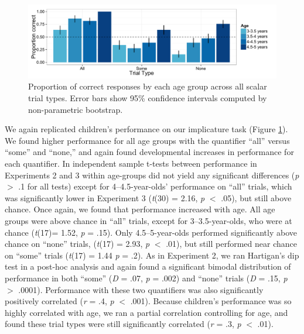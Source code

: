 \documentclass[man]{apa2}
\begin{document}
\begin{figure} 
 \begin{center} 
  \includegraphics[scale=.5]{figures/exp3_performance.pdf} 
  \caption{\label{fig:exp3_perf} Proportion of correct responses by each age group across all scalar trial types. Error bars show 95\% confidence intervals computed by non-parametric bootstrap.} 
 \end{center} 
\end{figure}

We again replicated children's performance on our implicature task (Figure \ref{fig:exp3_perf}). We found higher performance for all age groups with the quantifier ``all'' versus ``some'' and ``none,'' and again found developmental increases in performance for each quantifier. In independent sample t-tests between performance in Experiments 2 and 3 within age-groups did not yield any significant differences (\emph{p} $>$ .1 for all tests) except for 4--4.5-year-olds' performance on ``all'' trials, which was significantly lower in Experiment 3 (\emph{t}(30) = 2.16, \emph{p} $<$ .05), but still above chance. Once again, we found that performance increased with age. All age groups were above chance in ``all'' trials, except for 3--3.5-year-olds, who were at chance (\emph{t}(17)= 1.52, \emph{p} = .15).  Only 4.5--5-year-olds performed significantly above chance on ``none'' trials, (\emph{t}(17) = 2.93, \emph{p} $<$ .01), but still performed near chance on ``some'' trials (\emph{t}(17) = 1.44 \emph{p} = .2). As in Experiment 2, we ran Hartigan's dip test in a post-hoc analysis and again found a significant bimodal distribution of performance in both ``some'' (\textit{D} = .07, \textit{p} = .002) and ``none'' trials (\textit{D} = .15, \textit{p} $>$ .0001). Performance with these two quantifiers was also significantly positively correlated (\emph{r} = .4, \emph{p} $<$ .001). Because children's performance was so highly correlated with age, we ran a partial correlation controlling for age, and found these trial types were still significantly correlated (\emph{r} = .3, \emph{p} $<$ .01). 

\end{document}
